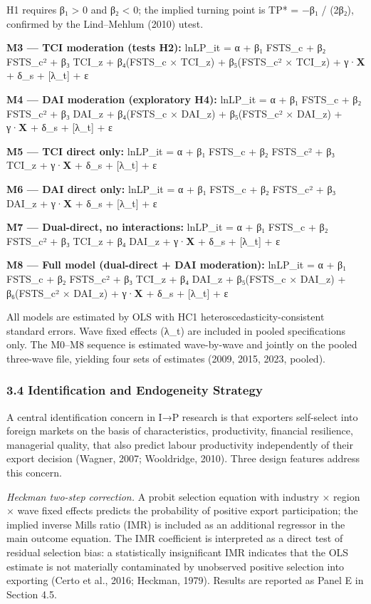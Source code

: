 \documentclass[12pt,a4paper]{article}
\begin{document}
H1 requires β₁ \textgreater{} 0 and β₂ \textless{} 0; the implied
turning point is TP* = −β₁ / (2β₂), confirmed by the Lind--Mehlum (2010)
utest.

\textbf{M3 --- TCI moderation (tests H2):} lnLP\_it = α + β₁ FSTS\_c +
β₂ FSTS\_c² + β₃ TCI\_z + β₄(FSTS\_c × TCI\_z) + β₅(FSTS\_c² × TCI\_z) +
γ·\textbf{X} + δ\_s + {[}λ\_t{]} + ε

\textbf{M4 --- DAI moderation (exploratory H4):} lnLP\_it = α + β₁
FSTS\_c + β₂ FSTS\_c² + β₃ DAI\_z + β₄(FSTS\_c × DAI\_z) + β₅(FSTS\_c² ×
DAI\_z) + γ·\textbf{X} + δ\_s + {[}λ\_t{]} + ε

\textbf{M5 --- TCI direct only:} lnLP\_it = α + β₁ FSTS\_c + β₂ FSTS\_c²
+ β₃ TCI\_z + γ·\textbf{X} + δ\_s + {[}λ\_t{]} + ε

\textbf{M6 --- DAI direct only:} lnLP\_it = α + β₁ FSTS\_c + β₂ FSTS\_c²
+ β₃ DAI\_z + γ·\textbf{X} + δ\_s + {[}λ\_t{]} + ε

\textbf{M7 --- Dual-direct, no interactions:} lnLP\_it = α + β₁ FSTS\_c
+ β₂ FSTS\_c² + β₃ TCI\_z + β₄ DAI\_z + γ·\textbf{X} + δ\_s + {[}λ\_t{]}
+ ε

\textbf{M8 --- Full model (dual-direct + DAI moderation):} lnLP\_it = α
+ β₁ FSTS\_c + β₂ FSTS\_c² + β₃ TCI\_z + β₄ DAI\_z + β₅(FSTS\_c ×
DAI\_z) + β₆(FSTS\_c² × DAI\_z) + γ·\textbf{X} + δ\_s + {[}λ\_t{]} + ε

All models are estimated by OLS with HC1 heteroscedasticity-consistent
standard errors. Wave fixed effects (λ\_t) are included in pooled
specifications only. The M0--M8 sequence is estimated wave-by-wave and
jointly on the pooled three-wave file, yielding four sets of estimates
(2009, 2015, 2023, pooled).

\hypertarget{34-identification-and-endogeneity-strategy}{%
\subsubsection{3.4 Identification and Endogeneity
Strategy}\label{34-identification-and-endogeneity-strategy}}

A central identification concern in I→P research is that exporters
self-select into foreign markets on the basis of characteristics,
productivity, financial resilience, managerial quality, that also
predict labour productivity independently of their export decision
(Wagner, 2007; Wooldridge, 2010). Three design features address this
concern.

\emph{Heckman two-step correction.} A probit selection equation with
industry × region × wave fixed effects predicts the probability of
positive export participation; the implied inverse Mills ratio (IMR) is
included as an additional regressor in the main outcome equation. The
IMR coefficient is interpreted as a direct test of residual selection
bias: a statistically insignificant IMR indicates that the OLS estimate
is not materially contaminated by unobserved positive selection into
exporting (Certo et al., 2016; Heckman, 1979). Results are reported as
Panel E in Section 4.5.
\end{document}
